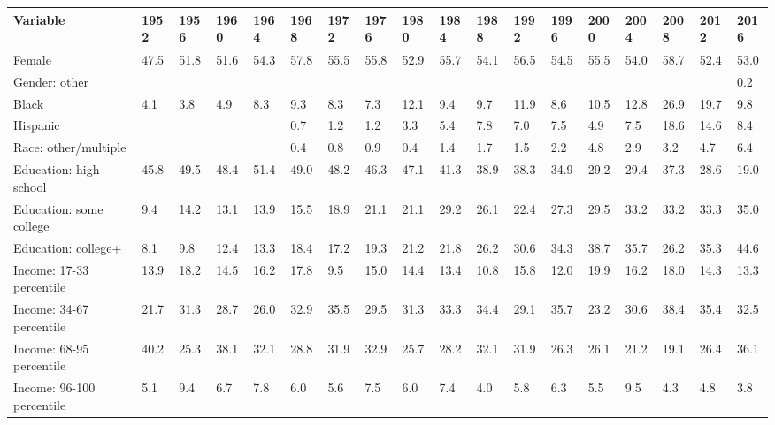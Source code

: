 \begin{tabular}{llllllllllllllllll}
  \toprule
Variable & 1952 & 1956 & 1960 & 1964 & 1968 & 1972 & 1976 & 1980 & 1984 & 1988 & 1992 & 1996 & 2000 & 2004 & 2008 & 2012 & 2016 \\ 
  \midrule
Female & 47.5 & 51.8 & 51.6 & 54.3 & 57.8 & 55.5 & 55.8 & 52.9 & 55.7 & 54.1 & 56.5 & 54.5 & 55.5 & 54.0 & 58.7 & 52.4 & 53.0 \\ 
  Gender: other &  &  &  &  &  &  &  &  &  &  &  &  &  &  &  &  & 0.2 \\ 
  Black & 4.1 & 3.8 & 4.9 & 8.3 & 9.3 & 8.3 & 7.3 & 12.1 & 9.4 & 9.7 & 11.9 & 8.6 & 10.5 & 12.8 & 26.9 & 19.7 & 9.8 \\ 
  Hispanic &  &  &  &  & 0.7 & 1.2 & 1.2 & 3.3 & 5.4 & 7.8 & 7.0 & 7.5 & 4.9 & 7.5 & 18.6 & 14.6 & 8.4 \\ 
  Race: other/multiple &  &  &  &  & 0.4 & 0.8 & 0.9 & 0.4 & 1.4 & 1.7 & 1.5 & 2.2 & 4.8 & 2.9 & 3.2 & 4.7 & 6.4 \\ 
  Education: high school & 45.8 & 49.5 & 48.4 & 51.4 & 49.0 & 48.2 & 46.3 & 47.1 & 41.3 & 38.9 & 38.3 & 34.9 & 29.2 & 29.4 & 37.3 & 28.6 & 19.0 \\ 
  Education: some college & 9.4 & 14.2 & 13.1 & 13.9 & 15.5 & 18.9 & 21.1 & 21.1 & 29.2 & 26.1 & 22.4 & 27.3 & 29.5 & 33.2 & 33.2 & 33.3 & 35.0 \\ 
  Education: college+ & 8.1 & 9.8 & 12.4 & 13.3 & 18.4 & 17.2 & 19.3 & 21.2 & 21.8 & 26.2 & 30.6 & 34.3 & 38.7 & 35.7 & 26.2 & 35.3 & 44.6 \\ 
  Income: 17-33 percentile & 13.9 & 18.2 & 14.5 & 16.2 & 17.8 & 9.5 & 15.0 & 14.4 & 13.4 & 10.8 & 15.8 & 12.0 & 19.9 & 16.2 & 18.0 & 14.3 & 13.3 \\ 
  Income: 34-67 percentile & 21.7 & 31.3 & 28.7 & 26.0 & 32.9 & 35.5 & 29.5 & 31.3 & 33.3 & 34.4 & 29.1 & 35.7 & 23.2 & 30.6 & 38.4 & 35.4 & 32.5 \\ 
  Income: 68-95 percentile & 40.2 & 25.3 & 38.1 & 32.1 & 28.8 & 31.9 & 32.9 & 25.7 & 28.2 & 32.1 & 31.9 & 26.3 & 26.1 & 21.2 & 19.1 & 26.4 & 36.1 \\ 
  Income: 96-100 percentile & 5.1 & 9.4 & 6.7 & 7.8 & 6.0 & 5.6 & 7.5 & 6.0 & 7.4 & 4.0 & 5.8 & 6.3 & 5.5 & 9.5 & 4.3 & 4.8 & 3.8 \\ 
   \bottomrule
\end{tabular}
